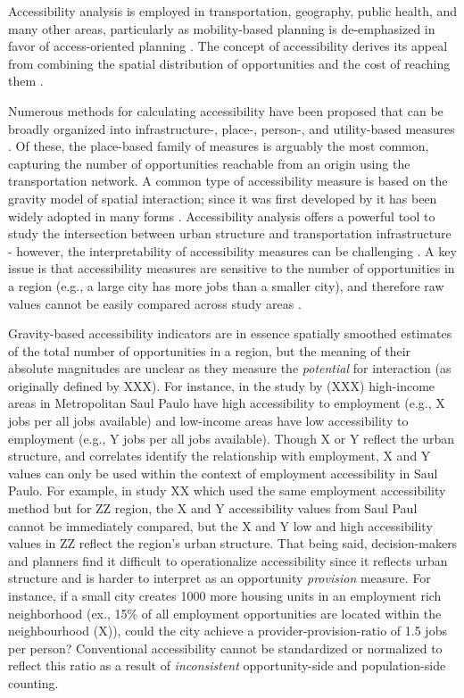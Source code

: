 \documentclass[]{elsarticle} %
\begin{document}
Accessibility analysis is employed in transportation, geography, public
health, and many other areas, particularly as mobility-based planning is
de-emphasized in favor of access-oriented planning
\citep{deboosere2018, handy2020, proffitt2017, yan2021}. The concept of
accessibility derives its appeal from combining the spatial distribution
of opportunities and the cost of reaching them \citep{hansen1959}.

Numerous methods for calculating accessibility have been proposed that
can be broadly organized into infrastructure-, place-, person-, and
utility-based measures \citep{geurs2004}. Of these, the place-based
family of measures is arguably the most common, capturing the number of
opportunities reachable from an origin using the transportation network.
A common type of accessibility measure is based on the gravity model of
spatial interaction; since it was first developed by \citet{hansen1959}
it has been widely adopted in many forms
\citep[e.g.,][]{cervero_transportation_2002, paez2004network, geurs2004, handy_measuring_1997, levinson_accessibility_1998, Arranz2019measuring}.
Accessibility analysis offers a powerful tool to study the intersection
between urban structure and transportation infrastructure - however, the
interpretability of accessibility measures can be challenging
\citep{geurs2004, miller2018}. A key issue is that accessibility
measures are sensitive to the number of opportunities in a region (e.g.,
a large city has more jobs than a smaller city), and therefore raw
values cannot be easily compared across study areas \citep{allen2019}.

Gravity-based accessibility indicators are in essence spatially smoothed
estimates of the total number of opportunities in a region, but the
meaning of their absolute magnitudes are unclear as they measure the
\emph{potential} for interaction (as originally defined by
\citeyearpar{wilson1971}XXX). For instance, in the study by (XXX)
high-income areas in Metropolitan Saul Paulo have high accessibility to
employment (e.g., X jobs per all jobs available) and low-income areas
have low accessibility to employment (e.g., Y jobs per all jobs
available). Though X or Y reflect the urban structure, and correlates
identify the relationship with employment, X and Y values can only be
used within the context of employment accessibility in Saul Paulo. For
example, in study XX which used the same employment accessibility method
but for ZZ region, the X and Y accessibility values from Saul Paul
cannot be immediately compared, but the X and Y low and high
accessibility values in ZZ reflect the region's urban structure. That
being said, decision-makers and planners find it difficult to
operationalize accessibility since it reflects urban structure and is
harder to interpret as an opportunity \emph{provision} measure. For
instance, if a small city creates 1000 more housing units in an
employment rich neighborhood (ex., 15\% of all employment opportunities
are located within the neighbourhood (X)), could the city achieve a
provider-provision-ratio of 1.5 jobs per person? Conventional
accessibility cannot be standardized or normalized to reflect this ratio
as a result of \emph{inconsistent} opportunity-side and population-side
counting.
\end{document}
